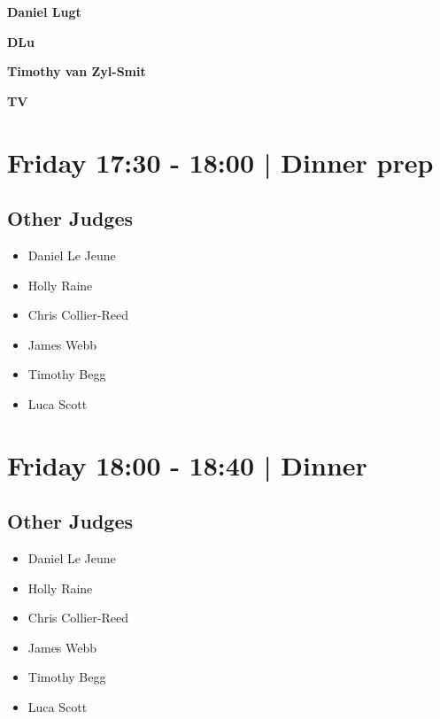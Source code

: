 \documentclass[10pt, A5]{article}
\newcommand{\newtitle}[1]{\begin{center}{\Huge\bfseries #1 }\\ \vspace{5mm}\end{center}}
\newcommand{\newsubtitle}[1]{\begin{center}{\color{grey}\Large\bfseries #1 }\\ \vspace{5mm}\end{center}}
\begin{document}
    
	\clearpage

		\newtitle{Daniel Lugt}
	\newsubtitle{DLu}

    
	\clearpage

		\newtitle{Timothy van Zyl-Smit}
	\newsubtitle{TV}

            \section*{Friday 17:30
        -
        18:00
        |
         Dinner prep}
        
                
        \subsection*{Other Judges}
        
            \begin{itemize}
                            \item Daniel Le Jeune
                            \item Holly Raine
                            \item Chris Collier-Reed
                            \item James Webb
                            \item Timothy Begg
                            \item Luca Scott
                        \end{itemize}
        

            \section*{Friday 18:00
        -
        18:40
        |
         Dinner }
        
                
        \subsection*{Other Judges}
        
            \begin{itemize}
                            \item Daniel Le Jeune
                            \item Holly Raine
                            \item Chris Collier-Reed
                            \item James Webb
                            \item Timothy Begg
                            \item Luca Scott
                        \end{itemize}
        
\end{document}
